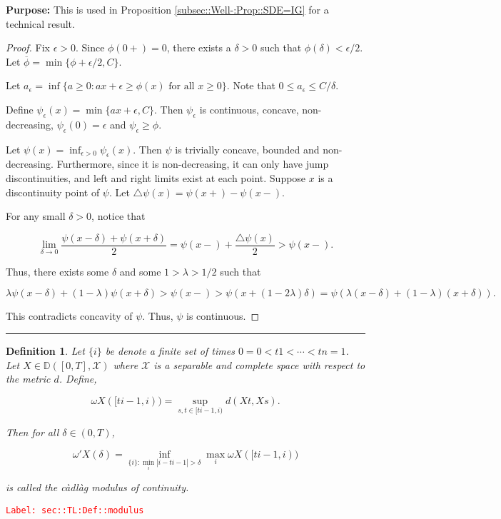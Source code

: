 \documentclass[12pt]{article}
\newcommand{\mb}{\mathbb}
\newcommand{\mc}{\mathcal}
\newcommand{\ra}{\rightarrow}
\newcommand{\ov}{\overline}
\newcommand{\te}{\text}
\newcommand{\ep}{\epsilon}
\newcommand{\tr}{\textcolor{red}}
\newcommand{\labe}[1]{\tr{\texttt{Label: #1}}}
\newcommand{\purpose}{\textbf{Purpose: }}
\newcommand{\ind}{\hspace{24pt}}
\newcommand{\lin}{\rule{\linewidth}{0.4 pt}}
\newcommand{\cad}{\mb{D}}							%
\newcommand{\x}{x}								%
\renewcommand{\t}{t}							%
\renewcommand{\tt}{s}							%
\newcommand{\X}{X}								%
\newcommand{\rate}{\lambda}						%
\newcommand{\modu}{\omega}						%
\newcommand{\cmodu}{\omega'}					%
\newcommand{\spce}{\mc{X}}						%
\newtheorem{defn}[thms]{Definition}
\begin{document}
\purpose This is used in Proposition \ref{subsec::Well-:Prop::SDE=IG} for a technical result.

\begin{proof}
Fix \(\ep > 0\). Since \(\phi(0+) = 0\), there exists a \(\delta > 0\) such that \(\phi(\delta) < \ep/2\). Let \(\ov{\phi} = \min\{\phi+\ep/2, C\}\).

\ind Let \(a_\ep = \inf\{a \geq 0: a\x + \ep \geq \phi(\x)\te{ for all } \x\geq 0\}\). Note that \(0\leq a_\ep \leq C/\delta\). 

\ind Define \(\psi_\ep(\x) = \min\{a\x+\ep,C\}\). Then \(\psi_\ep\) is continuous, concave, non-decreasing, \(\psi_\ep(0) = \ep\) and \(\psi_\ep \geq \phi\).

\ind Let \(\psi(\x) = \inf_{\ep > 0} \psi_\ep(\x)\). Then \(\psi\) is trivially concave, bounded and non-decreasing. Furthermore, since it is non-decreasing, it can only have jump discontinuities, and left and right limits exist at each point. Suppose \(\x\) is a discontinuity point of \(\psi\). Let \(\triangle\psi(\x) = \psi(\x+) - \psi(\x-)\).

For any small \(\delta > 0\), notice that

\[\lim_{\delta \ra 0} \frac{\psi(\x-\delta) + \psi(\x+\delta)}{2} = \psi(\x-) + \frac{\triangle\psi(\x)}{2} > \psi(\x-).\]

Thus, there exists some \(\delta\) and some \(1>\rate>1/2\) such that

\[\rate\psi(\x-\delta) + (1 -\rate)\psi(\x+\delta) > \psi(\x-) > \psi(\x + (1 - 2\rate)\delta) = \psi\left(\rate(\x-\delta) + (1 - \rate)(\x+\delta)\right).\]

This contradicts concavity of \(\psi\). Thus, \(\psi\) is continuous.
\end{proof}

\lin

\begin{defn}
Let \(\{	{i}\}\) be denote a finite set of times \(0=	{0} <\t{1} <\cdots < \t{n}=1\). Let \(\X\in \cad([0,T],\spce)\) where \(\spce\) is a separable and complete space with respect to the metric \(d\). Define,

\[\modu{\X}([\t{i-1},	{i})) = \sup_{\tt,\t\in [\t{i-1},	{i})} d(\X{}{\t},\X{}{\tt}).\]

Then for all \(\delta \in (0,T)\),

\[\cmodu{\X}(\delta) = \inf_{\{	{i}\}: \min_i |	{i} - \t{i-1}| > \delta} \max_{i} \modu{\X}([\t{i-1},	{i}))\]

is called the c\`adl\`ag modulus of continuity.
\label{sec::TL:Def::modulus}
\end{defn}
\labe{sec::TL:Def::modulus}
\end{document}
